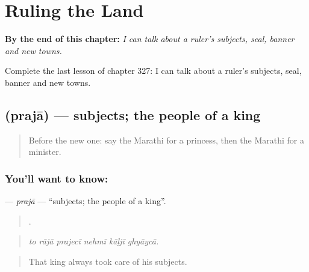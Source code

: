 
\chapter{Ruling the Land}
\label{ch:mr-ruling-the-land}

\begin{chapteropening}
\textbf{By the end of this chapter:} \emph{I can talk about a ruler's subjects, seal, banner and new towns.}

Complete the last lesson of chapter 327: I can talk about a ruler's subjects, seal, banner and new towns.
\end{chapteropening}

\section[\texorpdfstring{\mr{प्रजा} (prajā)}{प्रजा (prajā)}]{ (prajā) — subjects; the people of a king}

\label{lesson:MR-C327-praja}



\begin{quote}
Before the new one: say the Marathi for a princess, then the Marathi for a minister.
\end{quote}

\subsection*{You'll want to know: }
\textbf{} — \emph{prajā} — \textquotedblleft{}subjects; the people of a king\textquotedblright{}.

\begin{quote}
     .
\end{quote}

\begin{quote}
\emph{to rājā prajecī nehmī kāḷjī ghyāycā.}
\end{quote}

\begin{quote}
That king always took care of his subjects.
\end{quote}

